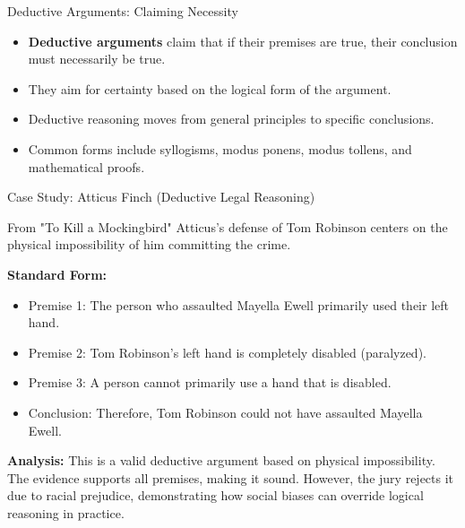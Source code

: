\documentclass{beamer}
\begin{document}
\begin{frame}{Deductive Arguments: Claiming Necessity}
    \begin{itemize}
        \item \textbf{Deductive arguments} claim that if their premises are true, their conclusion must necessarily be true.
        \item They aim for certainty based on the logical form of the argument.
        \item Deductive reasoning moves from general principles to specific conclusions.
        \item Common forms include syllogisms, modus ponens, modus tollens, and mathematical proofs.
    \end{itemize}
    
\end{frame}

\begin{frame}{Case Study: Atticus Finch (Deductive Legal Reasoning)}
    \begin{block}{From "To Kill a Mockingbird"}
        Atticus's defense of Tom Robinson centers on the physical impossibility of him committing the crime.
    \end{block}
    
    \textbf{Standard Form:}
    \begin{itemize}
        \item Premise 1: The person who assaulted Mayella Ewell primarily used their left hand.
        \item Premise 2: Tom Robinson's left hand is completely disabled (paralyzed).
        \item Premise 3: A person cannot primarily use a hand that is disabled.
        \item Conclusion: Therefore, Tom Robinson could not have assaulted Mayella Ewell.
    \end{itemize}
    
    \textbf{Analysis:} This is a valid deductive argument based on physical impossibility. The evidence supports all premises, making it sound. However, the jury rejects it due to racial prejudice, demonstrating how social biases can override logical reasoning in practice.
\end{frame}
\end{document}
